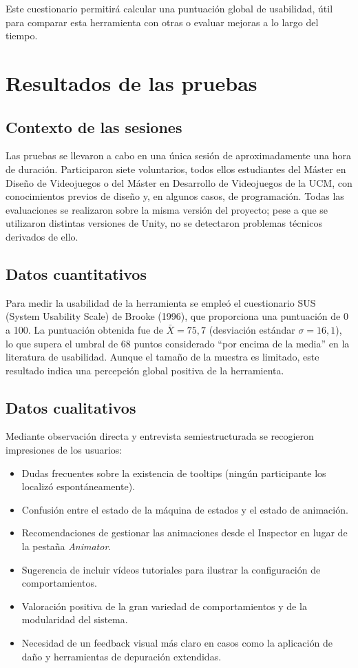 Este cuestionario permitirá calcular una puntuación global de usabilidad, útil para comparar esta herramienta con otras o evaluar mejoras a lo largo del tiempo.

\section{Resultados de las pruebas}

\subsection{Contexto de las sesiones}

Las pruebas se llevaron a cabo en una única sesión de aproximadamente una hora de duración. Participaron siete voluntarios, todos ellos estudiantes del Máster en Diseño de Videojuegos o del Máster en Desarrollo de Videojuegos de la UCM, con conocimientos previos de diseño y, en algunos casos, de programación. Todas las evaluaciones se realizaron sobre la misma versión del proyecto; pese a que se utilizaron distintas versiones de Unity, no se detectaron problemas técnicos derivados de ello.

\subsection{Datos cuantitativos}

Para medir la usabilidad de la herramienta se empleó el cuestionario SUS (System Usability Scale) de Brooke (1996), que proporciona una puntuación de 0 a 100. La puntuación obtenida fue de \(\bar{X}=75{,}7\) (desviación estándar \(\sigma=16{,}1\)), lo que supera el umbral de 68 puntos considerado “por encima de la media” en la literatura de usabilidad. Aunque el tamaño de la muestra es limitado, este resultado indica una percepción global positiva de la herramienta.

\subsection{Datos cualitativos}

Mediante observación directa y entrevista semiestructurada se recogieron impresiones de los usuarios:

\begin{itemize}
  \item Dudas frecuentes sobre la existencia de tooltips (ningún participante los localizó espontáneamente).
  \item Confusión entre el estado de la máquina de estados y el estado de animación.
  \item Recomendaciones de gestionar las animaciones desde el Inspector en lugar de la pestaña \textit{Animator}.
  \item Sugerencia de incluir vídeos tutoriales para ilustrar la configuración de comportamientos.
  \item Valoración positiva de la gran variedad de comportamientos y de la modularidad del sistema.
  \item Necesidad de un feedback visual más claro en casos como la aplicación de daño y herramientas de depuración extendidas.
\end{itemize}


